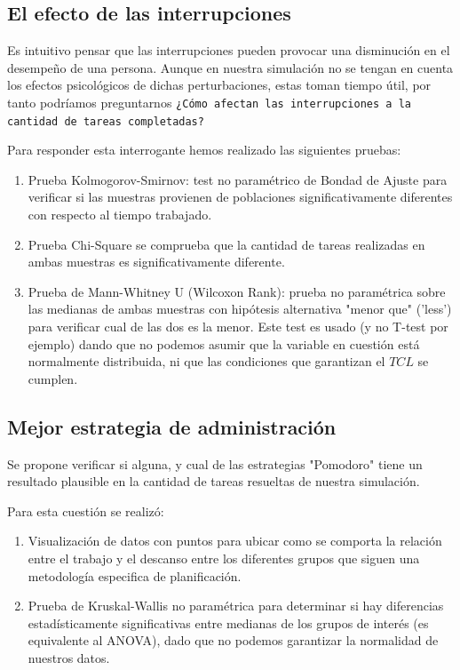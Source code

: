 \documentclass[10pt,a4paper,twocolumn]{article}
\begin{document}
\subsection{El efecto de las interrupciones}

Es intuitivo pensar que las interrupciones pueden provocar una disminuci\'on en el desempeño de una persona. Aunque en nuestra simulación no se tengan en cuenta los efectos psicológicos de dichas perturbaciones, estas toman tiempo útil, por tanto podríamos preguntarnos \texttt{¿Cómo afectan las interrupciones a la cantidad de tareas completadas?}

Para responder esta interrogante hemos realizado las siguientes pruebas:
\begin{enumerate}
    \item Prueba Kolmogorov-Smirnov: test no paramétrico de Bondad de Ajuste para verificar si las muestras provienen de poblaciones significativamente diferentes con respecto al tiempo trabajado.
    \item Prueba Chi-Square se comprueba que la cantidad de tareas realizadas en ambas muestras es significativamente diferente.
    \item Prueba de Mann-Whitney U (Wilcoxon Rank): prueba no paramétrica sobre las medianas de ambas muestras con hipótesis alternativa "menor que" ('less') para verificar cual de las dos es la menor. Este test es usado (y no T-test por ejemplo) dando que no podemos asumir que la variable en cuestión está normalmente distribuida, ni que las condiciones que garantizan el $TCL$ se cumplen.
\end{enumerate}

\subsection{Mejor estrategia de administración}

Se propone verificar si alguna, y cual de las estrategias "Pomodoro" tiene un resultado plausible en la cantidad de tareas resueltas de nuestra simulación. 

Para esta cuestión se realiz\'o:
\begin{enumerate}
    \item Visualización de datos con puntos para ubicar como se comporta la relación entre el trabajo y el descanso entre los diferentes grupos que siguen una metodología especifica de planificación. 
    \item Prueba de Kruskal-Wallis no paramétrica para determinar si hay diferencias estadísticamente significativas entre medianas de los grupos de interés (es equivalente al ANOVA), dado que no podemos garantizar la normalidad de nuestros datos.
\end{enumerate}
\end{document}
